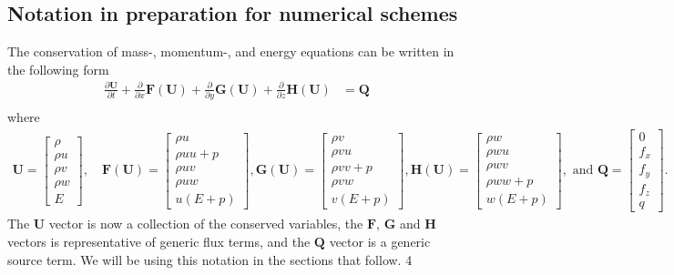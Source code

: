 \documentclass[10pt,letterpaper,notitlepage]{article}
\numberwithin{equation}{section}
\newcommand{\partialderiv}[2]{\frac{\partial #1}{\partial #2}}
\newcommand{\beqn}{\begin{equation}\begin{aligned}}
\newcommand{\eeqn}{\end{aligned}\end{equation}}
\begin{document}
\subsection{Notation in preparation for numerical schemes}
The conservation of mass-, momentum-, and energy equations can be written in the following form
\beqn \label{eq:euler_operator_form}
\partialderiv{\mathbf{U}}{t} + 
\partialderiv{}{x}\mathbf{F}(\mathbf{U}) +
\partialderiv{}{y}\mathbf{G}(\mathbf{U}) +
\partialderiv{}{z}\mathbf{H}(\mathbf{U}) 
&= 
 \mathbf{Q} \\
\eeqn 
where
\beqn 
\mathbf{U} = 
\begin{bmatrix}
\rho \\ 
\rho u \\
\rho v \\
\rho w \\ 
E
\end{bmatrix}
, \quad 
\mathbf{F}(\mathbf{U})=
\begin{bmatrix}
\rho u \\
\rho uu + p\\
\rho uv \\
\rho uw \\
u(E+p)
\end{bmatrix}
,
\mathbf{G}(\mathbf{U})=
\begin{bmatrix}
\rho v \\
\rho v u \\
\rho vv + p \\
\rho vw \\
v(E+p)
\end{bmatrix}
,
\mathbf{H}(\mathbf{U})=
\begin{bmatrix}
\rho w \\
\rho wu \\
\rho wv \\
\rho ww + p \\
w(E+p)
\end{bmatrix}
, \text{ and }
\mathbf{Q} = 
\begin{bmatrix}
0 \\
f_x \\
f_y \\
f_z \\
q
\end{bmatrix}.
\eeqn 
The $\mathbf{U}$ vector is now a collection of the conserved variables, 
the $\mathbf{F}$, $\mathbf{G}$ and $\mathbf{H}$ vectors is representative of generic flux terms, and the $\mathbf{Q}$ vector is a generic source term. We will be using this notation in the sections that follow.
4
\end{document}
